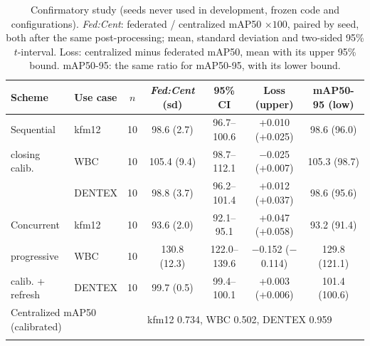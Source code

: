 \documentclass[pdflatex,sn-mathphys-num]{sn-jnl}
\newcommand{\fedcent}{\textit{Fed:Cent}}
\begin{document}
\begin{table}[t]
\caption{Confirmatory study (seeds never used in development, frozen code and configurations). \fedcent{}: federated / centralized mAP50 $\times100$, paired by seed, both after the same post-processing; mean, standard deviation and two-sided 95\% $t$-interval. Loss: centralized minus federated mAP50, mean with its upper 95\% bound. mAP50-95: the same ratio for mAP50-95, with its lower bound.}\label{tab:confirm}
\footnotesize
\setlength{\tabcolsep}{3pt}
\begin{tabular*}{\textwidth}{@{\extracolsep\fill}llccccc}
\toprule
Scheme & Use case & $n$ & \fedcent{} (sd) & 95\% CI & Loss (upper) & mAP50-95 (low) \\
\midrule
Sequential & kfm12 & 10 & 98.6 (2.7) & 96.7--100.6 & +0.010 (+0.025) & 98.6 (96.0) \\
closing calib. & WBC & 10 & 105.4 (9.4) & 98.7--112.1 & $-$0.025 (+0.007) & 105.3 (98.7) \\
 & DENTEX & 10 & 98.8 (3.7) & 96.2--101.4 & +0.012 (+0.037) & 98.6 (95.6) \\
\midrule
Concurrent & kfm12 & 10 & 93.6 (2.0) & 92.1--95.1 & +0.047 (+0.058) & 93.2 (91.4) \\
progressive & WBC & 10 & 130.8 (12.3) & 122.0--139.6 & $-$0.152 ($-$0.114) & 129.8 (121.1) \\
calib. + refresh & DENTEX & 10 & 99.7 (0.5) & 99.4--100.1 & +0.003 (+0.006) & 101.4 (100.6) \\
\midrule
\multicolumn{3}{l}{Centralized mAP50 (calibrated)} & \multicolumn{4}{l}{kfm12 0.734, WBC 0.502, DENTEX 0.959} \\
\botrule
\end{tabular*}
\end{table}
\end{document}
